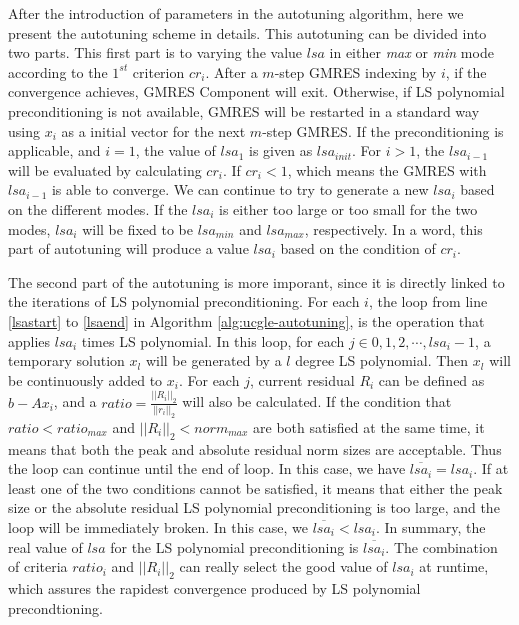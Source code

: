 After the introduction of parameters in the autotuning algorithm, here we present the autotuning scheme in details. This autotuning can be divided into two parts. This first part is to varying the value $lsa$ in either \textit{max} or \textit{min} mode according to the $1^{st}$ criterion $cr_i$. After a $m$-step GMRES indexing by $i$, if the convergence achieves, GMRES Component will exit. Otherwise, if LS polynomial preconditioning is not available, GMRES will be restarted in a standard way using $x_i$ as a initial vector for the next $m$-step GMRES. If the preconditioning is applicable, and $i=1$, the value of $lsa_1$ is given as $lsa_{init}$. For $i > 1$, the $lsa_{i-1}$ will be evaluated by calculating $cr_i$. If $cr_i < 1$, which means the GMRES with $lsa_{i-1}$ is able to converge. We can continue to try to generate a new $lsa_i$ based on the different modes. If the $lsa_i$ is  either too large or too small for the two modes, $lsa_i$ will be fixed to be $lsa_{min}$ and $lsa_{max}$, respectively. In a word, this part of autotuning will produce a value $lsa_i$ based on the condition of $cr_i$.

The second part of the autotuning is more imporant, since it is directly linked to the iterations of LS polynomial preconditioning. For each $i$, the loop from line \ref{lsastart} to \ref{lsaend} in Algorithm \ref{alg:ucgle-autotuning}, is the operation that applies $lsa_i$ times LS polynomial. In this loop, for each $j \in 0, 1, 2, \cdots, lsa_i - 1$, a temporary solution $x_l$ will be generated by a $l$ degree LS polynomial. Then $x_l$ will be continuously added to $x_i$. For each $j$, current residual $R_i$ can be defined as $b-Ax_i$, and a $ratio=\frac{||R_i||_2}{||r_{i}||_2}$ will also be calculated. If the condition that $ratio < ratio_{max}$ and $||R_i||_2 < norm_{max}$ are both satisfied at the same time, it means that both the peak and absolute residual norm sizes are acceptable. Thus the loop can continue until the end of loop. In this case, we have $\overline{lsa_i} = lsa_i$. If at least one of the two conditions cannot be satisfied, it means that either the peak size or the absolute residual LS polynomial preconditioning is too large, and the loop will be immediately broken. In this case, we $\overline{lsa_i} < lsa_i$. In summary, the real value of $lsa$ for the LS polynomial preconditioning is $\overline{lsa_i}$. The combination of criteria $ratio_i$ and $||R_i||_2$ can really select the good value of $lsa_i$ at runtime, which assures the rapidest convergence produced by LS polynomial precondtioning.


